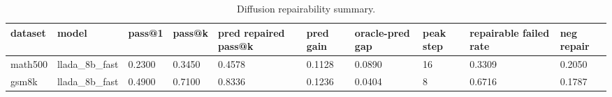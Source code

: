 \begin{table}[t]
\centering
\caption{Diffusion repairability summary.}
\label{tab:diffusion-repairability}
\begin{tabular}{llllllllll}
\hline
dataset & model & pass@1 & pass@k & pred repaired pass@k & pred gain & oracle-pred gap & peak step & repairable failed rate & neg repair \\
\hline
math500 & llada_8b_fast & 0.2300 & 0.3450 & 0.4578 & 0.1128 & 0.0890 & 16 & 0.3309 & 0.2050 \\
gsm8k & llada_8b_fast & 0.4900 & 0.7100 & 0.8336 & 0.1236 & 0.0404 & 8 & 0.6716 & 0.1787 \\
\hline
\end{tabular}
\end{table}
